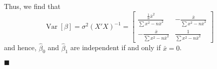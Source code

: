 \documentclass{article}
\newcommand{\Var}{\operatorname{Var}} %
\begin{document}
 Thus, we find that \[
 \Var[\beta] = \sigma^2 (X'X)^{-1} = 
  \begin{bmatrix}  \frac{\frac1n \bar x^2}{\sum x^2- n\bar x^2}&-\frac{\bar x}{\sum x^2- n\bar x^2}\\ 
 -\frac{\bar x}{\sum x^2- n\bar x^2} & \frac{1}{\sum x^2- n\bar x^2} \end{bmatrix}
 \]
and hence, \(\hat \beta_0 \) and \(\hat \beta_1\) are independent if and only if \(\bar x= 0\). 

 
  \begin{flushright}
\(\blacksquare\)
\end{flushright} 
\end{document}
